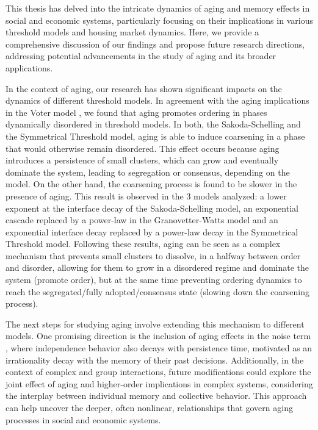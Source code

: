 This thesis has delved into the intricate dynamics of aging and memory effects in social and economic systems, particularly focusing on their implications in various threshold models and housing market dynamics. Here, we provide a comprehensive discussion of our findings and propose future research directions, addressing potential advancements in the study of aging and its broader applications.

In the context of aging, our research has shown significant impacts on the dynamics of different threshold models. In agreement with the aging implications in the Voter model \cite{artime-2018,artime2019herding,peralta-2020C,peralta-2018,peralta-2020A}, we found that aging promotes ordering in phases dynamically disordered in threshold models. In both, the Sakoda-Schelling and the Symmetrical Threshold model, aging is able to induce coarsening in a phase that would otherwise remain disordered. This effect occurs because aging introduces a persistence of small clusters, which can grow and eventually dominate the system, leading to segregation or consensus, depending on the model. On the other hand, the coarsening process is found to be slower in the presence of aging. This result is observed in the 3 models analyzed: a lower exponent at the interface decay of the Sakoda-Schelling model, an exponential cascade replaced by a power-law in the Granovetter-Watts model and an exponential interface decay replaced by a power-law decay in the Symmetrical Threshold model. Following these results, aging can be seen as a complex mechanism that prevents small clusters to dissolve, in a halfway between order and disorder, allowing for them to grow in a disordered regime and dominate the system (promote order), but at the same time preventing ordering dynamics to reach the segregated/fully adopted/consensus state (slowing down the coarsening process). 

The next steps for studying aging involve extending this mechanism to different models. One promising direction is the inclusion of aging effects in the noise term \cite{vieira2023noisy,llabres2024aging}, where independence behavior also decays with persistence time, motivated as an irrationality decay with the memory of their past decisions. Additionally, in the context of complex and group interactions, future modifications could explore the joint effect of aging and higher-order implications in complex systems, considering the interplay between individual memory and collective behavior. This approach can help uncover the deeper, often nonlinear, relationships that govern aging processes in social and economic systems. 

